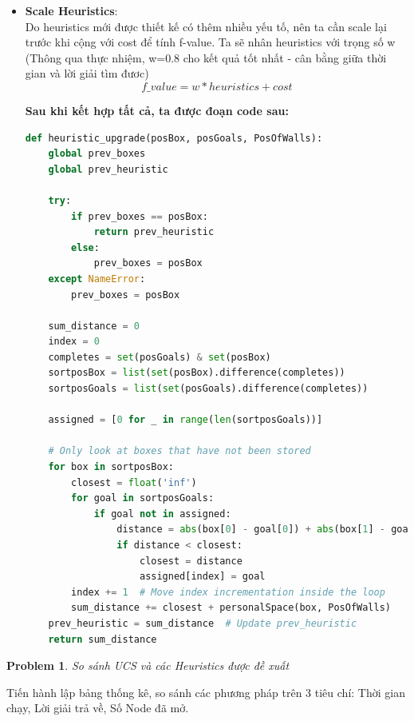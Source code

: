 \documentclass[12pt]{article}
\newtheorem{problem}{Problem}
\begin{document}
\begin{itemize}
	\item \textbf{Scale Heuristics}: \\
	Do heuristics mới được thiết kế có thêm nhiều yếu tố, nên ta cần scale lại trước khi cộng với cost để tính f-value. Ta sẽ nhân heuristics với trọng số w (Thông qua thực nhiệm, w=0.8 cho kết quả tốt nhất - cân bằng giữa thời gian và lời giải tìm đươc)
	{\large
	\begin{equation}
		f\_value = w*heuristics + cost
	\end{equation}}
	
	\newpage
	\noindent \hspace*{-1em}\textbf{
	Sau khi kết hợp tất cả, ta được đoạn code sau:}
  \begin{tcolorbox}[boxrule=0.5pt, colback=white]
  \begin{lstlisting}[language=python, numbers=none, basicstyle=\ttfamily\footnotesize]
def heuristic_upgrade(posBox, posGoals, PosOfWalls):
    global prev_boxes
    global prev_heuristic
    
    try:
        if prev_boxes == posBox:
            return prev_heuristic
        else:
            prev_boxes = posBox
    except NameError:
        prev_boxes = posBox

    sum_distance = 0
    index = 0
    completes = set(posGoals) & set(posBox)
    sortposBox = list(set(posBox).difference(completes))
    sortposGoals = list(set(posGoals).difference(completes))

    assigned = [0 for _ in range(len(sortposGoals))]

    # Only look at boxes that have not been stored
    for box in sortposBox:
        closest = float('inf') 
        for goal in sortposGoals:
            if goal not in assigned:
                distance = abs(box[0] - goal[0]) + abs(box[1] - goal[1])
                if distance < closest:
                    closest = distance
                    assigned[index] = goal
        index += 1  # Move index incrementation inside the loop
        sum_distance += closest + personalSpace(box, PosOfWalls)
    prev_heuristic = sum_distance  # Update prev_heuristic
    return sum_distance
  \end{lstlisting}
  \end{tcolorbox}
\end{itemize}


\newpage
\begin{problem}
	So sánh UCS và các Heuristics được đề xuất
\end{problem}
	Tiến hành lập bảng thống kê, so sánh các phương pháp trên 3 tiêu chí: Thời gian chạy, Lời giải trả về, Số Node đã mở. \\
\end{document}
